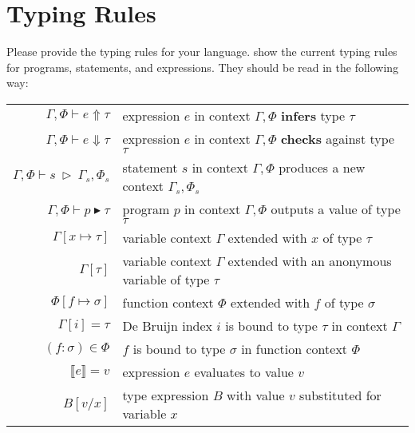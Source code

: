 \section{Typing Rules}

Please provide the typing rules for your language.
 show the current typing rules for programs, statements, and expressions.
They should be read in the following way:

\vspace{1em}
\begin{tabular}{r | l}
    $\Gamma,\Phi \vdash e \Uparrow \tau$                    & expression $e$ in context $\Gamma,\Phi$ \textbf{infers} type $\tau$ \\
    $\Gamma,\Phi \vdash e \Downarrow \tau$                  & expression $e$ in context $\Gamma,\Phi$ \textbf{checks} against type $\tau$ \\
    $\Gamma,\Phi \vdash s\ \triangleright\ \Gamma_s,\Phi_s$ & statement $s$ in context $\Gamma,\Phi$ produces a new context $\Gamma_s,\Phi_s$\\
    $\Gamma,\Phi \vdash p \blacktriangleright \tau$  & program $p$ in context $\Gamma,\Phi$ outputs a value of type $\tau$ \\
    $\Gamma[x \mapsto \tau]$                         & variable context $\Gamma$ extended with $x$ of type $\tau$ \\
    $\Gamma[\tau]$                                   & variable context $\Gamma$ extended with an anonymous variable of type $\tau$ \\
    $\Phi[f \mapsto \sigma]$                         & function context $\Phi$ extended with $f$ of type $\sigma$ \\
    $\Gamma[i] = \tau$                               & De Bruijn index $i$ is bound to type $\tau$ in context $\Gamma$ \\
    $(f : \sigma) \in \Phi$                          & $f$ is bound to type $\sigma$ in function context $\Phi$ \\
    $\llbracket e \rrbracket = v$                    & expression $e$ evaluates to value $v$ \\
    $B[v/x]$                                         & type expression $B$ with value $v$ substituted for variable $x$ \\
\end{tabular}





